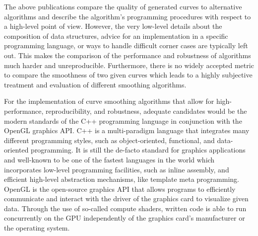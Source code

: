 \documentclass{stdlocal}
\begin{document}
The above publications compare the quality of generated curves to alternative algorithms and describe the algorithm's programming procedures with respect to a high-level point of view.
However, the very low-level details about the composition of data structures, advice for an implementation in a specific programming language, or ways to handle difficult corner cases are typically left out.
This makes the comparison of the performance and robustness of algorithms much harder and unreproducible.
Furthermore, there is no widely accepted metric to compare the smoothness of two given curves which leads to a highly subjective treatment and evaluation of different smoothing algorithms.

For the implementation of curve smoothing algorithms that allow for high-performance, reproducibility, and robustness, adequate candidates would be the modern standards of the C++ programming language in conjunction with the OpenGL graphics API.
C++ is a multi-paradigm language that integrates many different programming styles, such as object-oriented, functional, and data-oriented programming.
It is still the de-facto standard for graphics applications and well-known to be one of the fastest languages in the world which incorporates low-level programming facilities, such as inline assembly, and efficient high-level abstraction mechanisms, like template meta programming.
OpenGL is the open-source graphics API that allows programs to efficiently communicate and interact with the driver of the graphics card to visualize given data.
Through the use of so-called compute shaders, written code is able to run concurrently on the GPU independently of the graphics card's manufacturer or the operating system.
\autocite{stroustrup2014,meyers2014,vandevoorde2018,reddy2011,cppreference,isocpp,opengl}
\end{document}
